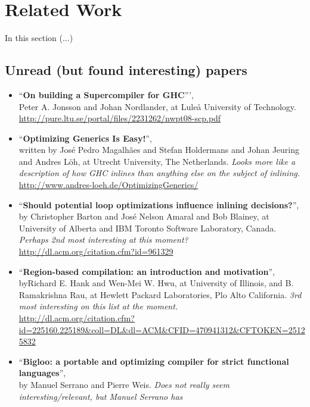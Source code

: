 
\section{Related Work}

In this section (...)

\subsection{Unread (but found interesting) papers}

\begin{itemize}
	\item ``\textbf{On building a Supercompiler for GHC}''', \\ Peter A. Jonsson
and Johan Nordlander, at Luleå University of Technology. \\
\url{http://pure.ltu.se/portal/files/2231262/nwpt08-scp.pdf}
	\item ``\textbf{Optimizing Generics Is Easy!}'', \\ written by José Pedro
Magalhães and Stefan Holdermans and Johan Jeuring and Andres Löh, at Utrecht
University, The Netherlands.
\textit{Looks more like a description of how GHC inlines than anything else on
the subject of inlining.}\\
\url{http://www.andres-loeh.de/OptimizingGenerics/}
	\item ``\textbf{Should potential loop optimizations influence inlining
decisions?}'', by Christopher Barton and José Nelson Amaral and Bob Blainey, at
University of Alberta and IBM Toronto Software Laboratory, Canada.
\textit{Perhaps 2nd most interesting at this moment?}\\
\url{http://dl.acm.org/citation.cfm?id=961329}
	\item ``\textbf{Region-based compilation: an introduction and motivation}'',
\\ byRichard E. Hank and Wen-Mei W. Hwu, at University of Illinois, and B.
Ramakrishna Rau, at Hewlett Packard Laboratories, Plo Alto California.
\textit{3rd most interesting on this list at the moment.} \\
\url{http://dl.acm.org/citation.cfm?id=225160.225189&coll=DL&dl=ACM&CFID=470941312&CFTOKEN=25125832}
	\item ``\textbf{Bigloo: a portable and optimizing compiler for strict
functional languages}'', \\ by Manuel Serrano and Pierre Weis.
\textit{Does not really seem interesting/relevant, but Manuel Serrano has
}
\end{itemize}
